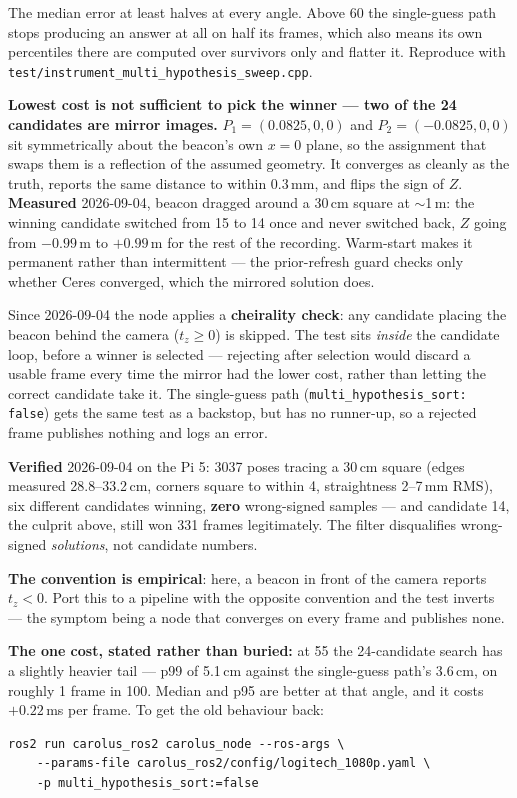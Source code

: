 \documentclass[11pt]{report}
\newenvironment{warningbox}%
  {\begin{lrbox}{\warnbox}\begin{minipage}{0.90\textwidth}}%
  {\end{minipage}\end{lrbox}%
   \begin{center}\fcolorbox{black}{codebg}{\usebox{\warnbox}}\end{center}}
\begin{document}
The median error at least halves at every angle. Above 60\textdegree{} the
single-guess path stops producing an answer at all on half its frames, which
also means its own percentiles there are computed over survivors only and
flatter it. Reproduce with
\texttt{test/instrument\_multi\_hypothesis\_sweep.cpp}.

\begin{warningbox}
\textbf{Lowest cost is not sufficient to pick the winner --- two of the 24
candidates are mirror images.} $P_1=(0.0825,0,0)$ and $P_2=(-0.0825,0,0)$
sit symmetrically about the beacon's own $x=0$ plane, so the assignment
that swaps them is a reflection of the assumed geometry. It converges as
cleanly as the truth, reports the same distance to within 0.3\,mm, and
flips the sign of $Z$. \textbf{Measured} 2026-09-04, beacon dragged around
a 30\,cm square at $\sim$1\,m: the winning candidate switched from 15 to 14
once and never switched back, $Z$ going from $-0.99$\,m to $+0.99$\,m for
the rest of the recording. Warm-start makes it permanent rather than
intermittent --- the prior-refresh guard checks only whether Ceres
converged, which the mirrored solution does.

Since 2026-09-04 the node applies a \textbf{cheirality check}: any
candidate placing the beacon behind the camera ($t_z \geq 0$) is skipped.
The test sits \emph{inside} the candidate loop, before a winner is
selected --- rejecting after selection would discard a usable frame every
time the mirror had the lower cost, rather than letting the correct
candidate take it. The single-guess path (\texttt{multi\_hypothesis\_sort:
false}) gets the same test as a backstop, but has no runner-up, so a
rejected frame publishes nothing and logs an error.

\textbf{Verified} 2026-09-04 on the Pi 5: 3037 poses tracing a 30\,cm square (edges measured 28.8--33.2\,cm,
corners square to within 4\textdegree{}, straightness 2--7\,mm RMS), six different candidates winning, \textbf{zero} wrong-signed
samples --- and candidate 14, the culprit above, still won 331 frames
legitimately. The filter disqualifies wrong-signed \emph{solutions}, not
candidate numbers.

\textbf{The convention is empirical}: here, a beacon in front of the camera
reports $t_z<0$. Port this to a pipeline with the opposite convention and
the test inverts --- the symptom being a node that converges on every frame
and publishes none.
\end{warningbox}

\begin{warningbox}
\textbf{The one cost, stated rather than buried:} at 55\textdegree{} the
24-candidate search has a slightly heavier tail --- p99 of 5.1\,cm against
the single-guess path's 3.6\,cm, on roughly 1 frame in 100. Median and p95
are better at that angle, and it costs $+0.22$\,ms per frame. To get the old
behaviour back:

\begin{lstlisting}[style=shell]
ros2 run carolus_ros2 carolus_node --ros-args \
    --params-file carolus_ros2/config/logitech_1080p.yaml \
    -p multi_hypothesis_sort:=false
\end{lstlisting}
\end{warningbox}
\end{document}
